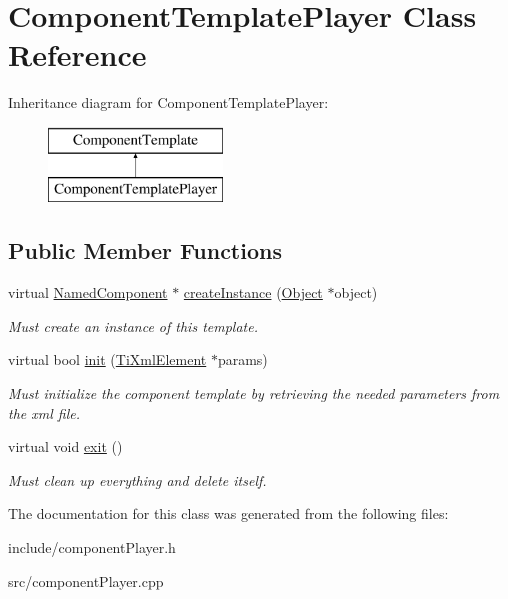 \hypertarget{classComponentTemplatePlayer}{
\section{\-Component\-Template\-Player \-Class \-Reference}
\label{d6/d10/classComponentTemplatePlayer}
}
\-Inheritance diagram for \-Component\-Template\-Player\-:\begin{figure}[H]
\begin{center}
\leavevmode
\includegraphics[height=2.000000cm]{d6/d10/classComponentTemplatePlayer}
\end{center}
\end{figure}
\subsection*{\-Public \-Member \-Functions}
\begin{DoxyCompactItemize}
\item 
\hypertarget{classComponentTemplatePlayer_acefce4e539caa4c0e5582d7d3cc701db}{
virtual \hyperlink{classNamedComponent}{\-Named\-Component} $\ast$ \hyperlink{classComponentTemplatePlayer_acefce4e539caa4c0e5582d7d3cc701db}{create\-Instance} (\hyperlink{classObject}{\-Object} $\ast$object)}
\label{d6/d10/classComponentTemplatePlayer_acefce4e539caa4c0e5582d7d3cc701db}

\begin{DoxyCompactList}\small\item\em \-Must create an instance of this template. \end{DoxyCompactList}\item 
\hypertarget{classComponentTemplatePlayer_aadf46cabef261621ce2a30421be94938}{
virtual bool \hyperlink{classComponentTemplatePlayer_aadf46cabef261621ce2a30421be94938}{init} (\hyperlink{classTiXmlElement}{\-Ti\-Xml\-Element} $\ast$params)}
\label{d6/d10/classComponentTemplatePlayer_aadf46cabef261621ce2a30421be94938}

\begin{DoxyCompactList}\small\item\em \-Must initialize the component template by retrieving the needed parameters from the xml file. \end{DoxyCompactList}\item 
\hypertarget{classComponentTemplatePlayer_a1275933593084dfbcfc39a25a6a593fd}{
virtual void \hyperlink{classComponentTemplatePlayer_a1275933593084dfbcfc39a25a6a593fd}{exit} ()}
\label{d6/d10/classComponentTemplatePlayer_a1275933593084dfbcfc39a25a6a593fd}

\begin{DoxyCompactList}\small\item\em \-Must clean up everything and delete itself. \end{DoxyCompactList}\end{DoxyCompactItemize}


\-The documentation for this class was generated from the following files\-:\begin{DoxyCompactItemize}
\item 
include/component\-Player.\-h\item 
src/component\-Player.\-cpp\end{DoxyCompactItemize}
